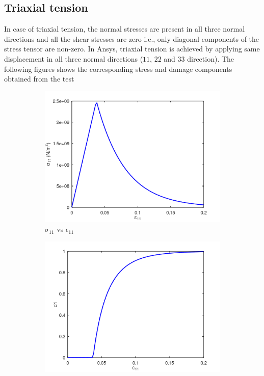 \documentclass[a4paper,12pt]{extarticle}
\begin{document}
\subsection*{Triaxial tension}
\indent\indent\indent In case of triaxial tension, the normal stresses are present in all three normal directions and all the shear stresses are zero i.e., only diagonal components of the stress tensor are non-zero.  In Ansys, triaxial tension is achieved by applying same displacement in all three normal directions ($11$, $22$ and $33$ direction).  
The following figures shows the corresponding stress and damage components obtained from the test

\begin{figure}[htbp]
  
     \captionsetup[subfigure]{justification=centering}
     \begin{subfigure}{0.45\textwidth}
        \centering
         \includegraphics[width=1.25\textwidth]{24.S11vsE11.png}
         \caption{$\sigma_{11}$ vs $\epsilon_{11}$}
         \label{fig:S11vsE11 2}
     \end{subfigure}
     \hfill
     \captionsetup[subfigure]{justification=centering}
     \begin{subfigure}{0.45\textwidth}
         \centering
         \includegraphics[width=1.25\textwidth]{24.d1.png}

\end{subfigure}
\end{figure}
\end{document}
